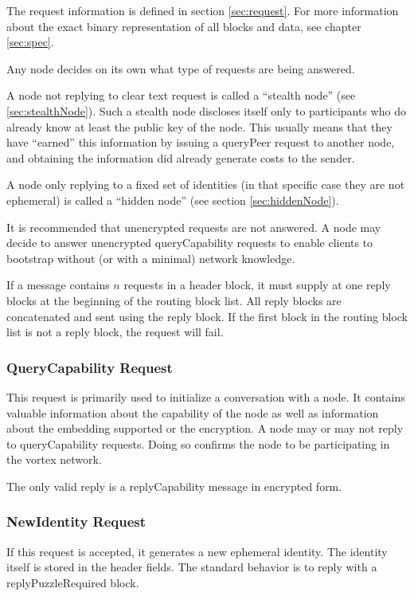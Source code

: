 The request information is defined in section \ref{sec:request}. For more information about the exact binary representation of all blocks and data, see chapter \ref{sec:spec}.

Any node decides on its own what type of requests are being answered. 

A node not replying to clear text request is called a ``stealth node'' (see \ref{sec:stealthNode}). Such a stealth node discloses itself only to participants who do already know at least the public key of the node. This usually means that they have ``earned'' this information by issuing a queryPeer request to another node, and obtaining the information did already generate costs to the sender.

A node only replying to a fixed set of identities (in that specific case they are not ephemeral) is called a ``hidden node'' (see section \ref{sec:hiddenNode}).

It is recommended that unencrypted requests are not answered. A node may decide to answer unencrypted queryCapability requests to enable clients to bootstrap without (or with a minimal) network knowledge.

If a message contains $n$ requests in a header block, it must supply at one reply blocks at the beginning of the routing block list. All reply blocks are concatenated and sent using the reply block. If the first block in the routing block list is not a reply block, the request will fail.

\subsubsection{QueryCapability Request}
This request is primarily used to initialize a conversation with a node. It contains valuable information about the capability of the node as well as information about the embedding supported or the encryption. A node may or may not reply to queryCapability requests. Doing so confirms the node to be participating in the vortex network.

The only valid reply is a replyCapability message in encrypted form.

\subsubsection{NewIdentity Request}
If this request is accepted, it generates a new ephemeral identity. The identity itself is stored in the header fields. The standard behavior is to reply with a replyPuzzleRequired block. 

